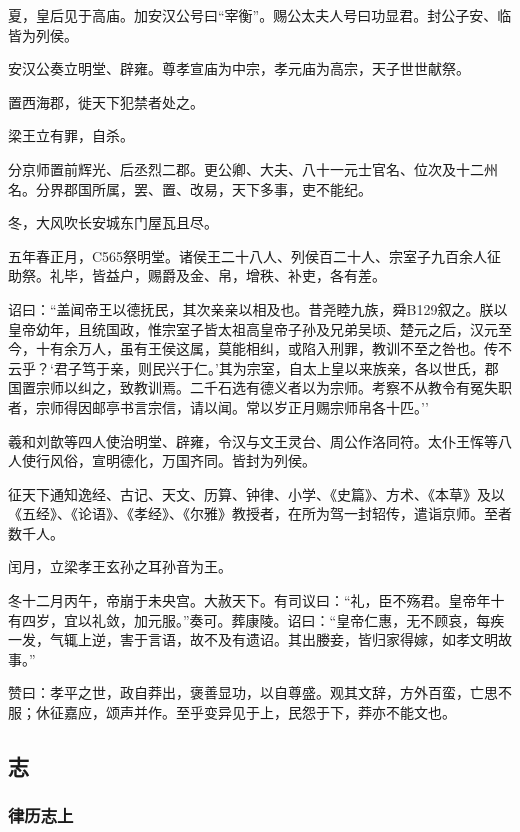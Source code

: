 \documentclass[]{article}
\begin{document}
夏，皇后见于高庙。加安汉公号曰``宰衡''。赐公太夫人号曰功显君。封公子安、临皆为列侯。

安汉公奏立明堂、辟雍。尊孝宣庙为中宗，孝元庙为高宗，天子世世献祭。

置西海郡，徙天下犯禁者处之。

梁王立有罪，自杀。

分京师置前辉光、后丞烈二郡。更公卿、大夫、八十一元士官名、位次及十二州名。分界郡国所属，罢、置、改易，天下多事，吏不能纪。

冬，大风吹长安城东门屋瓦且尽。

五年春正月，C565祭明堂。诸侯王二十八人、列侯百二十人、宗室子九百余人征助祭。礼毕，皆益户，赐爵及金、帛，增秩、补吏，各有差。

诏曰：``盖闻帝王以德抚民，其次亲亲以相及也。昔尧睦九族，舜B129叙之。朕以皇帝幼年，且统国政，惟宗室子皆太祖高皇帝子孙及兄弟吴顷、楚元之后，汉元至今，十有余万人，虽有王侯这属，莫能相纠，或陷入刑罪，教训不至之咎也。传不云乎？`君子笃于亲，则民兴于仁。'其为宗室，自太上皇以来族亲，各以世氏，郡国置宗师以纠之，致教训焉。二千石选有德义者以为宗师。考察不从教令有冤失职者，宗师得因邮亭书言宗信，请以闻。常以岁正月赐宗师帛各十匹。''

羲和刘歆等四人使治明堂、辟雍，令汉与文王灵台、周公作洛同符。太仆王恽等八人使行风俗，宣明德化，万国齐同。皆封为列侯。

征天下通知逸经、古记、天文、历算、钟律、小学、《史篇》、方术、《本草》及以《五经》、《论语》、《孝经》、《尔雅》教授者，在所为驾一封轺传，遣诣京师。至者数千人。

闰月，立梁孝王玄孙之耳孙音为王。

冬十二月丙午，帝崩于未央宫。大赦天下。有司议曰：``礼，臣不殇君。皇帝年十有四岁，宜以礼敛，加元服。''奏可。葬康陵。诏曰：``皇帝仁惠，无不顾哀，每疾一发，气辄上逆，害于言语，故不及有遗诏。其出媵妾，皆归家得嫁，如孝文明故事。''

赞曰：孝平之世，政自莽出，褒善显功，以自尊盛。观其文辞，方外百蛮，亡思不服；休征嘉应，颂声并作。至乎变异见于上，民怨于下，莽亦不能文也。

\hypertarget{header-n1205}{%
\subsection{志}\label{header-n1205}}

\hypertarget{header-n1206}{%
\subsubsection{律历志上}\label{header-n1206}}
\end{document}
